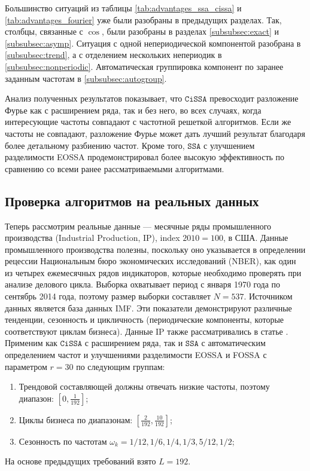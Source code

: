 \documentclass[12pt, specialist, subf
]{disser}
\theoremstyle{definition}
\newcommand{\SSA}{\texttt{SSA}}
\newcommand{\CISSA}{\texttt{CiSSA}}
\begin{document}
Большинство ситуаций из таблицы \ref{tab:advantages_ssa_cissa} и  \ref{tab:advantages_fourier} уже были разобраны в предыдущих разделах. Так, столбцы, связанные с $\cos$, были разобраны в разделах \ref{subsubsec:exact} и \ref{subsubsec:asymp}. Ситуация с одной непериодической компонентой разобрана в \ref{subsubsec:trend}, а с отделением нескольких непериодик в \ref{subsubsec:nonperiodic}. Автоматическая группировка компонент по заранее заданным частотам в \ref{subsubsec:autogroup}.

Анализ полученных результатов показывает, что $\CISSA$ превосходит разложение Фурье как с расширением ряда, так и без него, во всех случаях, когда интересующие частоты совпадают с частотной решеткой алгоритмов. Если же частоты не совпадают, разложение Фурье может дать лучший результат благодаря более детальному разбиению частот. Кроме того, $\SSA$ с улучшением разделимости EOSSA продемонстрировал более высокую эффективность по сравнению со всеми ранее рассматриваемыми алгоритмами.



\subsection{Проверка алгоритмов на реальных данных}
\label{subsubsec:real_dataZz}

Теперь рассмотрим реальные данные --- месячные ряды промышленного производства (Industrial Production, IP), index $2010 = 100$, в США. Данные промышленного производства полезны, поскольку оно указывается в определении рецессии Национальным бюро экономических исследований (NBER), как один из четырех ежемесячных рядов индикаторов, которые необходимо проверять при анализе делового цикла. Выборка охватывает период с января 1970 года по сентябрь 2014 года, поэтому размер выборки составляет $N = 537$. Источником данных является база данных IMF. Эти показатели демонстрируют различные тенденции, сезонность и цикличность (периодические компоненты, которые соответствуют циклам бизнеса). Данные IP также рассматривались в статье \cite{bogalo2020}.
Применим как $\CISSA$ с расширением ряда, так и $\SSA$ с автоматическим определением частот и улучшениями разделимости EOSSA и FOSSA с параметром $r = 30$ по следующим группам:
\begin{enumerate}
	\item Трендовой составляющей должны отвечать низкие частоты, поэтому диапазон: $\left[0, \frac{1}{192}\right]$;
	\item Циклы бизнеса по диапазонам: $\left[\frac{2}{192}, \frac{10}{192}\right]$;
	\item Сезонность по частотам $\omega_k = 1/12, 1/6, 1/4, 1/3, 5/12, 1/2$;
\end{enumerate}
На основе предыдущих требований взято $L = 192$.
\end{document}
